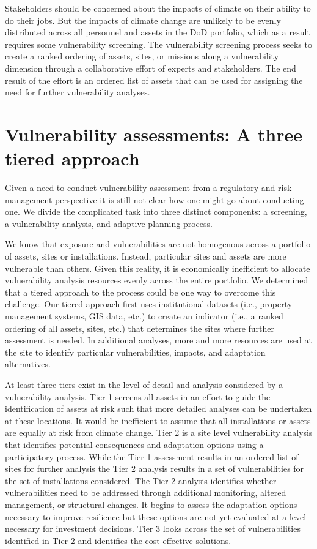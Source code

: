 \documentclass[10pt]{amsart}
\begin{document}
Stakeholders should be concerned about the impacts of climate on their ability to do their jobs. 
But the impacts of climate change are unlikely to be evenly distributed across all personnel and assets in the DoD portfolio, which as a result requires some vulnerability screening.
The vulnerability screening process seeks to create a ranked ordering of assets, sites, or missions along a vulnerability dimension through a collaborative effort of experts and stakeholders.
The end result of the effort is an ordered list of assets that can be used for assigning the need for further vulnerability analyses. 

\section{Vulnerability assessments: A three tiered approach}
Given a need to conduct vulnerability assessment from a regulatory and risk management perspective it is still not clear how one might go about conducting one.
We divide the complicated task into three distinct components: a screening, a vulnerability analysis, and adaptive planning process. 

We know that exposure and vulnerabilities are not homogenous across a portfolio of assets, sites or installations. 
Instead, particular sites and assets are more vulnerable than others.
Given this reality, it is economically inefficient to allocate vulnerability analysis resources evenly across the entire portfolio.
We determined that a tiered approach to the process could be one way to overcome this challenge. 
Our tiered approach first uses institutional datasets (i.e., property management systems, GIS data, etc.) to create an indicator (i.e., a ranked ordering of all assets, sites, etc.) that determines the sites where further assessment is needed. 
In additional analyses, more and more resources are used at the site to identify particular vulnerabilities, impacts, and adaptation alternatives. 

At least three tiers exist in the level of detail and analysis considered by a vulnerability analysis.
Tier 1 screens all assets in an effort to guide the identification of assets at risk such that more detailed analyses can be undertaken at these locations.
It would be inefficient to assume that all installations or assets are equally at risk from climate change.
Tier 2 is a site level vulnerability analysis that identifies potential consequences and adaptation options using a participatory process.
While the Tier 1 assessment results in an ordered list of sites for further analysis the Tier 2 analysis results in a set of vulnerabilities for the set of installations considered.
The Tier 2 analysis identifies whether vulnerabilities need to be addressed through additional monitoring, altered management, or structural changes.
It begins to assess the adaptation options necessary to improve resilience but these options are not yet evaluated at a level necessary for investment decisions.
Tier 3 looks across the set of vulnerabilities identified in Tier 2 and identifies the cost effective solutions.
\end{document}
